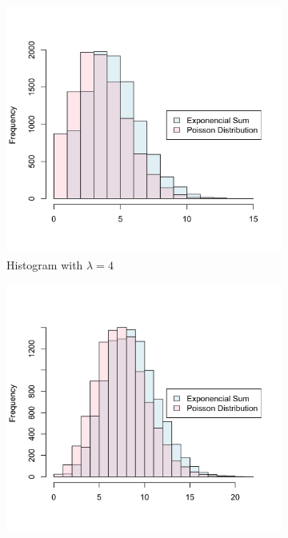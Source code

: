 \documentclass[10pt,leter,openany]{article}
\begin{document}
	 
	 
	 \begin{figure}
	 	\centering
	 	\begin{subfigure}[b]{0.475\textwidth}
	 		\centering
	 		\includegraphics[width=\textwidth]{extras/hg_changing_lambda_10000_4}
	 		\caption[]%
	 		{{\small Histogram with $\lambda = 4$}}    
	 		\label{fig:mean and std of net14}
	 	\end{subfigure}
	 	\hfill
	 	\begin{subfigure}[b]{0.475\textwidth}  
	 		\centering 
	 		\includegraphics[width=\textwidth]{extras/hg_changing_lambda_10000_8}

\end{subfigure}
\end{figure}
\end{document}
